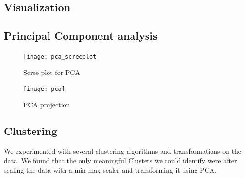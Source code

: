 \subsection{Visualization}%
\label{sub:visualization}

\subsection{Principal Component analysis}%
\label{sub:pca}

\begin{figure}[H]
  \texttt{[image: pca\_screeplot]}
  \caption{Scree plot for PCA}%
  \label{fig:pca-scree}
\end{figure}

\begin{figure}[H]
  \texttt{[image: pca]}
  \caption{PCA projection}%
  \label{fig:pca}
\end{figure}

\subsection{Clustering}%
\label{sub:clustering}

We experimented with several clustering algorithms and transformations on the data. We
found that the only meaningful Clusters we could identify were after scaling the data with
a min-max scaler and transforming it using PCA.
